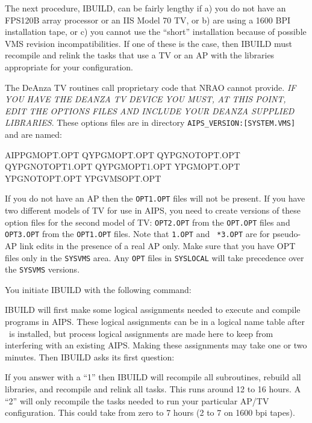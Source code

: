 The next procedure, IBUILD, can be fairly lengthy if a) you do not have
an FPS120B array processor or an IIS Model 70 TV, or b) are using a
1600 BPI installation tape, or c) you cannot use the ``short''
installation because of possible VMS revision incompatibilities.  If
one of these is the case, then IBUILD must recompile and relink the
tasks that use a TV or an AP with the libraries appropriate for your
configuration.

The DeAnza TV routines call proprietary code that NRAO cannot provide.
{\it IF YOU HAVE THE DEANZA TV DEVICE YOU MUST, AT THIS POINT, EDIT THE
OPTIONS FILES AND INCLUDE YOUR DEANZA SUPPLIED LIBRARIES\/}.  These
options files are in directory {\tt AIPS\_VERSION:[SYSTEM.VMS]} and are
named:\medskip

\fortran
AIPPGMOPT.OPT    QYPGMOPT.OPT     QYPGNOTOPT.OPT   QYPGNOTOPT1.OPT
QYPGMOPT1.OPT    YPGMOPT.OPT      YPGNOTOPT.OPT    YPGVMSOPT.OPT
\endfortran\medskip

If you do not have an AP then the {\tt *OPT1.OPT} files will not be
present.  If you have two different models of TV for use in AIPS, you
need to create versions of these option files for the second model of
TV: {\tt *OPT2.OPT} from the {\tt *OPT.OPT} files and {\tt *OPT3.OPT}
from the {\tt *OPT1.OPT} files.  Note that {\tt *1.OPT} and {\tt
*3.OPT} are for pseudo-AP link edits in the presence of a real AP
only.  Make sure that you have OPT files only in the {\tt SYSVMS}
area.  Any {\tt OPT} files in {\tt SYSLOCAL} will take precedence over
the {\tt SYSVMS} versions.

You initiate IBUILD with the following command:\medskip

\medskip

\noindent
IBUILD will first make some logical assignments needed to execute
and compile programs in AIPS.  These logical assignments can be
in a logical name table after \aips\ is installed, but process logical
assignments are made here to keep from interfering with an existing
AIPS.  Making these assignments may take one or two minutes.  Then
IBUILD asks its first question:\medskip


\noindent
If you answer with a ``1'' then IBUILD will recompile all subroutines,
rebuild all libraries, and recompile and relink all tasks.  This runs
around 12 to 16 hours.  A ``2'' will only recompile the tasks needed to
run your particular AP/TV configuration.  This could take from zero
to 7 hours (2 to 7 on 1600 bpi tapes).

